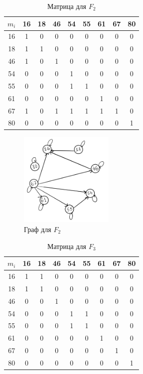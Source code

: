 \documentclass[a4paper, 14pt]{article}
\begin{document}
\begin{table}
\centering
\begin{tabular}{|c|c|c|c|c|c|c|c|c|}
    \hline
    $m_i$ & 16 & 18 & 46 & 54 & 55 & 61 & 67 & 80 \\
    \hline
    16 & 1 & 0 & 0 & 0 & 0 & 0 & 0 & 0 \\
    \hline
    18 & 1 & 1 & 0 & 0 & 0 & 0 & 0 & 0 \\
    \hline
    46 & 1 & 0 & 1 & 0 & 0 & 0 & 0 & 0 \\
    \hline
    54 & 0 & 0 & 0 & 1 & 0 & 0 & 0 & 0 \\
    \hline
    55 & 0 & 0 & 0 & 1 & 1 & 0 & 0 & 0 \\
    \hline
    61 & 0 & 0 & 0 & 0 & 0 & 1 & 0 & 0 \\
    \hline
    67 & 1 & 0 & 1 & 1 & 1 & 1 & 1 & 0 \\
    \hline
    80 & 0 & 0 & 0 & 0 & 0 & 0 & 0 & 1 \\
    \hline
\end{tabular}
\caption{Матрица для $F_2$}
\label{Матрица:2}
\end{table}

\begin{figure}
    \centering
    \includegraphics[width=0.4\textwidth]{graph2.png}
    \caption{Граф для $F_2$}
    \label{Рисунок:2}
\end{figure}

\begin{table}
\centering
\begin{tabular}{|c|c|c|c|c|c|c|c|c|}
    \hline
    $m_i$ & 16 & 18 & 46 & 54 & 55 & 61 & 67 & 80 \\
    \hline
    16 & 1 & 1 & 0 & 0 & 0 & 0 & 0 & 0 \\
    \hline
    18 & 1 & 1 & 0 & 0 & 0 & 0 & 0 & 0 \\
    \hline
    46 & 0 & 0 & 1 & 0 & 0 & 0 & 0 & 0 \\
    \hline
    54 & 0 & 0 & 0 & 1 & 1 & 0 & 0 & 0 \\
    \hline
    55 & 0 & 0 & 0 & 1 & 1 & 0 & 0 & 0 \\
    \hline
    61 & 0 & 0 & 0 & 0 & 0 & 1 & 0 & 0 \\
    \hline
    67 & 0 & 0 & 0 & 0 & 0 & 0 & 1 & 0 \\
    \hline
    80 & 0 & 0 & 0 & 0 & 0 & 0 & 0 & 1 \\
    \hline
\end{tabular}
\caption{Матрица для $F_3$}
\label{Матрица:3}
\end{table}
\end{document}
